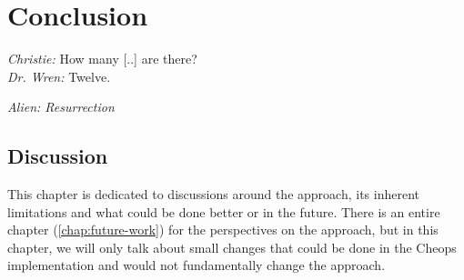 
\part*{Conclusion} %

\epigraph{\emph{Christie:} How many [..] are there?\\
\emph{Dr. Wren:} Twelve.}{\emph{Alien: Resurrection}}


\chapter{Discussion} %
\label{chap:discussion}

This chapter is dedicated to discussions around the approach, its
inherent limitations and what could be done better or in the future.
%
There is an entire chapter (\autoref{chap:future-work}) for the
perspectives on the approach, but in this chapter, we will only talk
about small changes that could be done in the Cheops implementation
and would not fundamentally change the approach.

